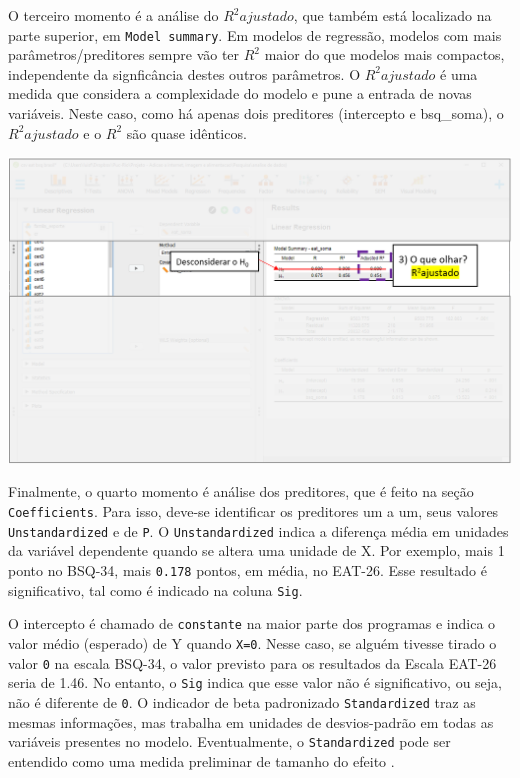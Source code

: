 \documentclass[
]{book}
\begin{document}
O terceiro momento é a análise do \(R^2 ajustado\), que também está localizado na parte superior, em \texttt{Model\ summary}. Em modelos de regressão, modelos com mais parâmetros/preditores sempre vão ter \(R^2\) maior do que modelos mais compactos, independente da signficância destes outros parâmetros. O \(R^2 ajustado\) é uma medida que considera a complexidade do modelo e pune a entrada de novas variáveis. Neste caso, como há apenas dois preditores (intercepto e bsq\_soma), o \(R^2 ajustado\) e o \(R^2\) são quase idênticos.

\includegraphics{./img/cap_reg_resultados3.png}

Finalmente, o quarto momento é análise dos preditores, que é feito na seção \texttt{Coefficients}. Para isso, deve-se identificar os preditores um a um, seus valores \texttt{Unstandardized} e de \texttt{P}. O \texttt{Unstandardized} indica a diferença média em unidades da variável dependente quando se altera uma unidade de X. Por exemplo, mais 1 ponto no BSQ-34, mais \texttt{0.178} pontos, em média, no EAT-26. Esse resultado é significativo, tal como é indicado na coluna \texttt{Sig}.

O intercepto é chamado de \texttt{constante} na maior parte dos programas e indica o valor médio (esperado) de Y quando \texttt{X=0}. Nesse caso, se alguém tivesse tirado o valor \texttt{0} na escala BSQ-34, o valor previsto para os resultados da Escala EAT-26 seria de 1.46. No entanto, o \texttt{Sig} indica que esse valor não é significativo, ou seja, não é diferente de \texttt{0}. O indicador de beta padronizado \texttt{Standardized} traz as mesmas informações, mas trabalha em unidades de desvios-padrão em todas as variáveis presentes no modelo. Eventualmente, o \texttt{Standardized} pode ser entendido como uma medida preliminar de tamanho do efeito \citep{fox2016}.
\end{document}
